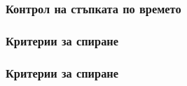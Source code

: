 \documentclass{beamer}
\begin{document}
\begin{frame}
\frametitle{Контрол на стъпката по времето}


\end{frame}

\begin{frame}
\frametitle{Критерии за спиране}


\end{frame}

\begin{frame}
\frametitle{Критерии за спиране}


\end{frame}
\end{document}
